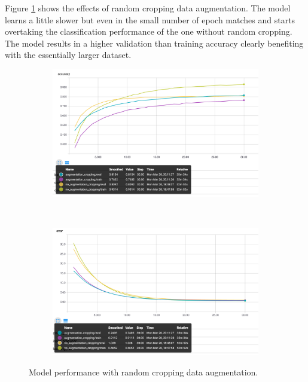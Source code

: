 \documentclass[12pt]{article}
\begin{document}
Figure \ref{fig:aug} shows the effects of random cropping data augmentation. The model learns a little slower but even in the small number of epoch matches and starts overtaking the classification performance of the one without random cropping. The model results in a higher validation than training accuracy clearly benefiting with the essentially larger dataset.

\begin{figure}[ht!]
    \centering
    \begin{subfigure}[t]{0.475\textwidth}
        \centering
        \includegraphics[width=1.0\linewidth]{auga.png}
    \end{subfigure}%
    ~ 
    \begin{subfigure}[t]{0.475\textwidth}
        \centering
        \includegraphics[width=1.0\linewidth]{augt.png}
    \end{subfigure}
    \caption{Model performance with random cropping data augmentation. }
    \label{fig:aug}
\end{figure}
\end{document}
